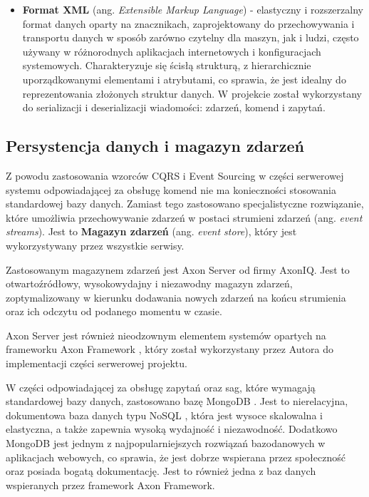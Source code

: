 \begin{itemize}
    \item \textbf{Format XML} (ang. \textit{Extensible Markup Language}) - elastyczny i rozszerzalny format danych oparty na znacznikach, zaprojektowany do przechowywania i transportu danych w sposób zarówno czytelny dla maszyn, jak i ludzi, często używany w różnorodnych aplikacjach internetowych i konfiguracjach systemowych. Charakteryzuje się ścisłą strukturą, z hierarchicznie uporządkowanymi elementami i atrybutami, co sprawia, że jest idealny do reprezentowania złożonych struktur danych. W projekcie został wykorzystany do serializacji i deserializacji wiadomości: zdarzeń, komend i zapytań.

\end{itemize}

\subsection{Persystencja danych i magazyn zdarzeń}

Z powodu zastosowania wzorców CQRS i Event Sourcing w części serwerowej systemu odpowiadającej za obsługę komend nie ma konieczności stosowania standardowej bazy danych. Zamiast tego zastosowano specjalistyczne rozwiązanie, które umożliwia przechowywanie zdarzeń w postaci strumieni zdarzeń (ang. \textit{event streams}). Jest to \textbf{Magazyn zdarzeń} (ang. \textit{event store}), który jest wykorzystywany przez wszystkie serwisy.

Zastosowanym magazynem zdarzeń jest Axon Server \cite{axonserver} od firmy AxonIQ. Jest to otwartoźródłowy, wysokowydajny i niezawodny magazyn zdarzeń, zoptymalizowany w kierunku dodawania nowych zdarzeń na końcu strumienia oraz ich odczytu od podanego momentu w czasie.

Axon Server jest również nieodzownym elementem systemów opartych na frameworku Axon Framework \cite{axonframework}, który został wykorzystany przez Autora do implementacji części serwerowej projektu.

W części odpowiadającej za obsługę zapytań oraz sag, które wymagają standardowej bazy danych, zastosowano bazę MongoDB \cite{mongodb}. Jest to nierelacyjna, dokumentowa baza danych typu NoSQL \cite{nosql},  która jest wysoce skalowalna i elastyczna, a także zapewnia wysoką wydajność i niezawodność. Dodatkowo MongoDB jest jednym z najpopularniejszych rozwiązań bazodanowych w aplikacjach webowych, co sprawia, że jest dobrze wspierana przez społeczność oraz posiada bogatą dokumentację. Jest to również jedna z baz danych wspieranych przez framework Axon Framework.

